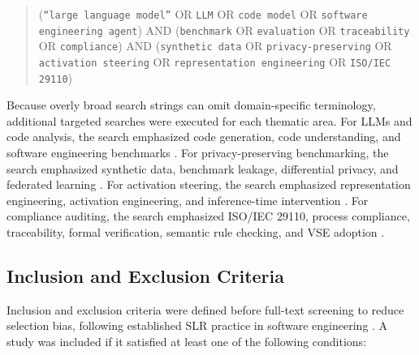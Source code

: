 \documentclass{ieeeaccess}
\begin{document}
\begin{quote}
\small
(\texttt{``large language model''} OR \texttt{LLM} OR \texttt{code model} OR \texttt{software engineering agent}) AND
(\texttt{benchmark} OR \texttt{evaluation} OR \texttt{traceability} OR \texttt{compliance}) AND
(\texttt{synthetic data} OR \texttt{privacy-preserving} OR \texttt{activation steering} OR \texttt{representation engineering} OR \texttt{ISO/IEC 29110})
\end{quote}

Because overly broad search strings can omit domain-specific terminology, additional targeted searches were executed for each thematic area. For LLMs and code analysis, the search emphasized code generation, code understanding, and software engineering benchmarks \cite{jiang2024surveycodegen,lu2021codexglue,feng2020codebert,wang2021codet5,li2023starcoder}. For privacy-preserving benchmarking, the search emphasized synthetic data, benchmark leakage, differential privacy, and federated learning \cite{bauer2024syntheticdata,dwork2006differentialprivacy,mcmahan2017communication,hernandez2024codeduplication,zhou2025lessleak}. For activation steering, the search emphasized representation engineering, activation engineering, and inference-time intervention \cite{zou2023representation,turner2023activation,li2023iti}. For compliance auditing, the search emphasized ISO/IEC 29110, process compliance, traceability, formal verification, semantic rule checking, and VSE adoption \cite{iso29110_2024,laporte2016vse,castellanos2022processcompliance,sirikrajai2025cpn,tuaycharoen2025auditorviews}.

\subsection{Inclusion and Exclusion Criteria}
\label{subsec:slr_criteria}

Inclusion and exclusion criteria were defined before full-text screening to reduce selection bias, following established SLR practice in software engineering \cite{kitchenham2007guidelines,kitchenham2010tertiary}. A study was included if it satisfied at least one of the following conditions:
\end{document}
